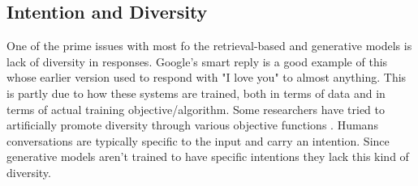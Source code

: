 \documentclass[letterpaper] {article} %
\begin{document}
\subsection{Intention and Diversity}
One of the prime issues with most fo the retrieval-based and generative models is lack of diversity in responses. Google's smart reply is a good example of this whose earlier version used to respond with "I love you" to almost anything. This is partly due to how these systems are trained, both in terms of data and in terms of actual training objective/algorithm.  Some researchers have tried to artificially promote diversity through various objective functions \cite{li2015diversity}. Humans conversations are typically specific to the input and carry an intention. Since generative models aren’t trained to have specific intentions they lack this kind of diversity.
\end{document}
